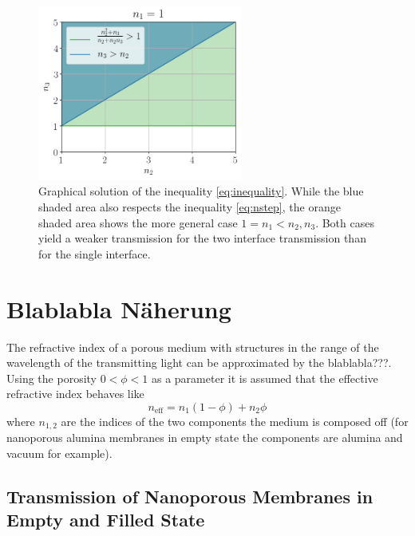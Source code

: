 \documentclass[../thesis.tex]{subfiles}
\begin{document}
            \begin{figure}[ht]
                \centering
                \includegraphics[width=0.6\textwidth]{images/inequality.png}
                \caption{Graphical solution of the inequality \cref{eq:inequality}. While the blue shaded area also respects the inequality \cref{eq:nstep}, the orange shaded area shows the more general case $1=n_1<n_2,n_3$. Both cases yield a weaker transmission for the two interface transmission than for the single interface.}
                \label{fig:inequality-solution}
            \end{figure}


    \section{Blablabla Näherung}
    \label{sec:porous-transmission}

        The refractive index of a porous medium with structures in the range of the wavelength of the transmitting light can be approximated by the blablabla???. Using the porosity $0<\phi<1$ as a parameter it is assumed that the effective refractive index behaves like
        \begin{equation}
            n_\mathrm{eff} = n_1 \left(1-\phi\right) + n_2 \phi
            \label{eq:porous-transmission-approximation}
        \end{equation}
        where $n_{1,2}$ are the indices of the two components the medium is composed off (for nanoporous alumina membranes in empty state the components are alumina and vacuum for example).

        


        \subsection{Transmission of Nanoporous Membranes in Empty and Filled State}
\end{document}
